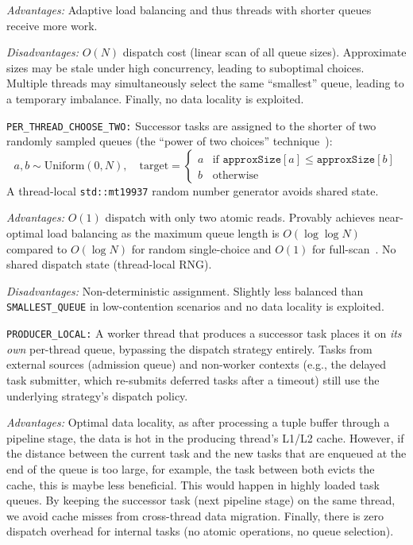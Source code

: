 \textit{Advantages:} Adaptive load balancing and thus threads with shorter queues receive more work.

\textit{Disadvantages:} $O(N)$ dispatch cost (linear scan of all queue sizes).
Approximate sizes may be stale under high concurrency, leading to suboptimal choices.
Multiple threads may simultaneously select the same ``smallest'' queue, leading to a temporary imbalance.
Finally, no data locality is exploited.

\texttt{PER\_THREAD\_CHOOSE\_TWO:}
Successor tasks are assigned to the shorter of two randomly sampled queues (the ``power of two choices'' technique~\cite{mitzenmacher2001power}):
\[
    a, b \sim \text{Uniform}(0, N), \quad \text{target} =
    \begin{cases}
        a & \text{if } \texttt{approxSize}[a] \leq \texttt{approxSize}[b] \\
        b & \text{otherwise}
    \end{cases}
\]
A thread-local \texttt{std::mt19937} random number generator avoids shared state.

\textit{Advantages:} $O(1)$ dispatch with only two atomic reads.
Provably achieves near-optimal load balancing as the maximum queue length is $O(\log \log N)$ compared to $O(\log N)$ for random single-choice and $O(1)$ for full-scan~\cite{mitzenmacher2001power}.
No shared dispatch state (thread-local RNG).

\textit{Disadvantages:} Non-deterministic assignment.
Slightly less balanced than \texttt{SMALLEST\_QUEUE} in low-contention scenarios and no data locality is exploited.

\texttt{PRODUCER\_LOCAL:}
A worker thread that produces a successor task places it on \emph{its own} per-thread queue, bypassing the dispatch strategy entirely.
Tasks from external sources (admission queue) and non-worker contexts (e.g., the delayed task submitter, which re-submits deferred tasks after a timeout) still use the underlying strategy's dispatch policy.

\textit{Advantages:} Optimal data locality, as after processing a tuple buffer through a pipeline stage, the data is hot in the producing thread's L1/L2 cache. However, if the distance between the current task and the new tasks that are enqueued at the end of the queue is too large, for example, the task between both evicts the cache, this is maybe less beneficial. This would happen in highly loaded task queues.
By keeping the successor task (next pipeline stage) on the same thread, we avoid cache misses from cross-thread data migration.
Finally, there is zero dispatch overhead for internal tasks (no atomic operations, no queue selection).

